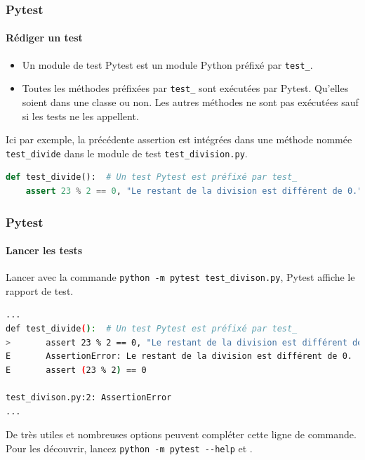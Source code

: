 \documentclass{beamer}
\begin{document}
    \begin{frame}[fragile]
        \frametitle{Pytest}
        \framesubtitle{Rédiger un test}
        \transdissolve
        \begin{itemize}
            \item Un module de test Pytest est un module Python préfixé par \lstinline{test_}.

            \item Toutes les méthodes préfixées par \lstinline{test_} sont exécutées par Pytest. Qu'elles soient
            dans une classe ou non. Les autres méthodes ne sont pas exécutées sauf si les tests ne les appellent.
        \end{itemize}
        Ici par exemple, la précédente assertion est intégrées dans une méthode nommée \lstinline{test_divide} dans le module de test \lstinline{test_division.py}.
        \begin{lstlisting}[language=Python]
def test_divide():  # Un test Pytest est préfixé par test_
    assert 23 % 2 == 0, "Le restant de la division est différent de 0."
        \end{lstlisting}
    \end{frame}


    \begin{frame}[fragile]
        \frametitle{Pytest}
        \framesubtitle{Lancer les tests}
        \transdissolve
        Lancer avec la commande \lstinline{python -m pytest test_divison.py}, Pytest affiche le rapport de test.
        \begin{lstlisting}[language=sh]
...
def test_divide():  # Un test Pytest est préfixé par test_
>       assert 23 % 2 == 0, "Le restant de la division est différent de 0."
E       AssertionError: Le restant de la division est différent de 0.
E       assert (23 % 2) == 0

test_divison.py:2: AssertionError
...
        \end{lstlisting}

        De très utiles et nombreuses options peuvent compléter cette ligne de commande.
        Pour les découvrir, lancez \lstinline{python -m pytest --help} et .
    \end{frame}
\end{document}

